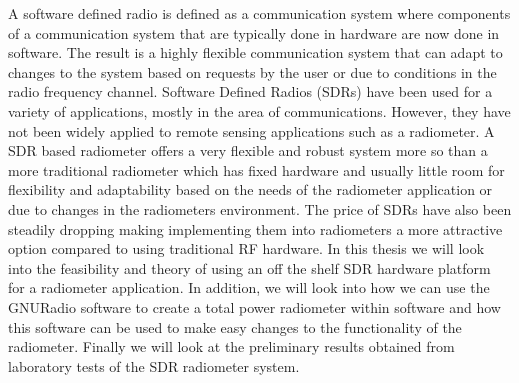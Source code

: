 
A software defined radio is defined as a communication system where components of a communication system that are typically done in hardware are now done in software.  The result is a highly flexible communication system that can adapt to changes to the system based on requests by the user or due to conditions in the radio frequency channel.  Software Defined Radios (SDRs) have been used for a variety of applications, mostly in the area of communications.  However, they have not been widely applied to remote sensing applications such as a radiometer.  A SDR based radiometer offers a very flexible and robust system more so than a more traditional radiometer which has fixed hardware and usually little room for flexibility and adaptability based on the needs of the radiometer application or due to changes in the radiometers environment.  The price of SDRs have also been steadily dropping making implementing them into radiometers a more attractive option compared to using traditional RF hardware.  In this thesis we will look into the feasibility and theory of using an off the shelf SDR hardware platform for a radiometer application.  In addition, we will look into how we can use the GNURadio software to create a total power radiometer within software and how this software can be used to make easy changes to the functionality of the radiometer.  Finally we will look at the preliminary results obtained from laboratory tests of the SDR radiometer system.
